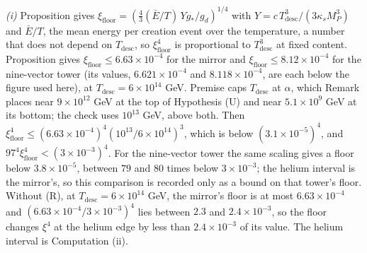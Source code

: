 \emph{(i)} Proposition  gives $\xi_{\mathrm{floor}} = (\tfrac43(\bar{E}/T)\,Y g_{*}/g_{d})^{1/4}$ with $Y = c\,T_{\mathrm{desc}}^{3}/(3\kappa_{s}M_{P}^{3})$ and $\bar{E}/T$, the mean energy per creation event over the temperature, a number that does not depend on $T_{\mathrm{desc}}$, so $\xi_{\mathrm{floor}}^{4}$ is proportional to $T_{\mathrm{desc}}^{3}$ at fixed content. Proposition  gives $\xi_{\mathrm{floor}} \leq 6.63 \times 10^{-4}$ for the mirror and $\xi_{\mathrm{floor}} \leq 8.12 \times 10^{-4}$ for the nine-vector tower (its values, $6.621 \times 10^{-4}$ and $8.118 \times 10^{-4}$, are each below the figure used here), at $T_{\mathrm{desc}} = 6 \times 10^{14}$ GeV. Premise  caps $T_{\mathrm{desc}}$ at $\alpha$, which Remark  places near $9 \times 10^{12}$ GeV at the top of Hypothesis (U) and near $5.1 \times 10^{9}$ GeV at its bottom; the check uses $10^{13}$ GeV, above both. Then $\xi_{\mathrm{floor}}^{4} \leq (6.63 \times 10^{-4})^{4}(10^{13}/6 \times 10^{14})^{3}$, which is below $(3.1 \times 10^{-5})^{4}$, and $97^{4}\xi_{\mathrm{floor}}^{4} < (3 \times 10^{-3})^{4}$. For the nine-vector tower the same scaling gives a floor below $3.8 \times 10^{-5}$, between $79$ and $80$ times below $3 \times 10^{-3}$; the helium interval is the mirror's, so this comparison is recorded only as a bound on that tower's floor. Without (R), at $T_{\mathrm{desc}} = 6 \times 10^{14}$ GeV, the mirror's floor is at most $6.63 \times 10^{-4}$ and $(6.63 \times 10^{-4}/3 \times 10^{-3})^{4}$ lies between $2.3$ and $2.4 \times 10^{-3}$, so the floor changes $\xi^{4}$ at the helium edge by less than $2.4 \times 10^{-3}$ of its value. The helium interval is Computation (ii).

